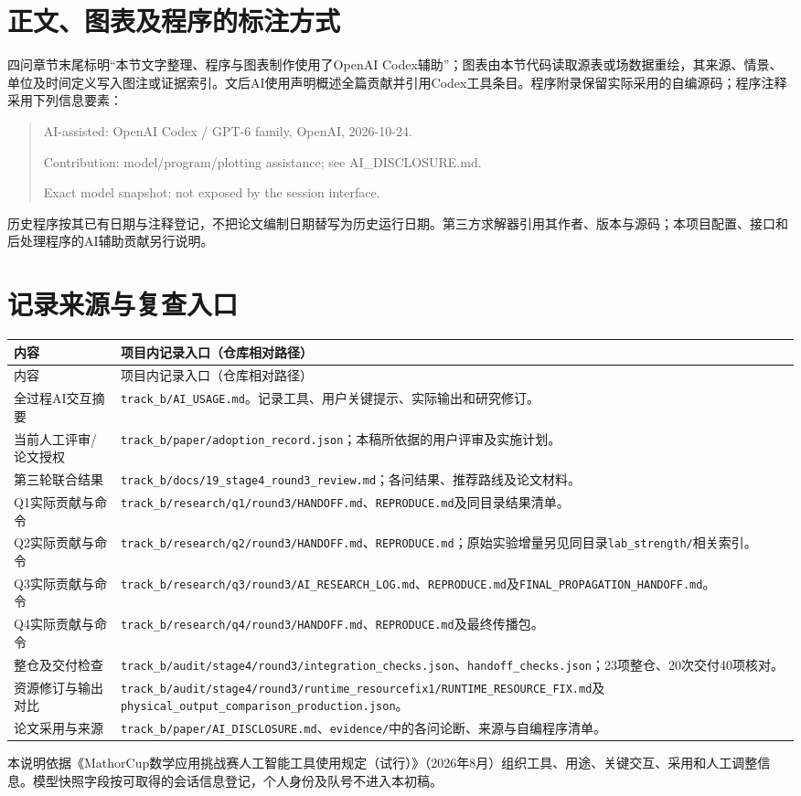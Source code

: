 \documentclass[UTF8,a4paper,zihao=-4,fontset=none]{ctexart}
\newcommand{\AIfile}[1]{\texttt{\nolinkurl{#1}}}
\begin{document}
\section{正文、图表及程序的标注方式}
四问章节末尾标明“本节文字整理、程序与图表制作使用了OpenAI Codex辅助”；图表由本节代码读取源表或场数据重绘，其来源、情景、单位及时间定义写入图注或证据索引。文后AI使用声明概述全篇贡献并引用Codex工具条目。程序附录保留实际采用的自编源码；程序注释采用下列信息要素：
\begin{quote}\small
AI-assisted: OpenAI Codex / GPT-6 family, OpenAI, 2026-10-24.\par
Contribution: model/program/plotting assistance; see AI\_DISCLOSURE.md.\par
Exact model snapshot: not exposed by the session interface.
\end{quote}
历史程序按其已有日期与注释登记，不把论文编制日期替写为历史运行日期。第三方求解器引用其作者、版本与源码；本项目配置、接口和后处理程序的AI辅助贡献另行说明。

\clearpage
\section{记录来源与复查入口}\label{sec:ai-evidence}
\begingroup\small
\begin{longtable}{p{3.6cm}p{10.0cm}}
\toprule 内容 & 项目内记录入口（仓库相对路径） \\
\midrule\endfirsthead
\toprule 内容 & 项目内记录入口（仓库相对路径） \\
\midrule\endhead
全过程AI交互摘要 & \AIfile{track_b/AI_USAGE.md}。记录工具、用户关键提示、实际输出和研究修订。 \\
当前人工评审/论文授权 & \AIfile{track_b/paper/adoption_record.json}；本稿所依据的用户评审及实施计划。 \\
第三轮联合结果 & \AIfile{track_b/docs/19_stage4_round3_review.md}；各问结果、推荐路线及论文材料。 \\
Q1实际贡献与命令 & \AIfile{track_b/research/q1/round3/HANDOFF.md}、\AIfile{REPRODUCE.md}及同目录结果清单。 \\
Q2实际贡献与命令 & \AIfile{track_b/research/q2/round3/HANDOFF.md}、\AIfile{REPRODUCE.md}；原始实验增量另见同目录\AIfile{lab_strength/}相关索引。 \\
Q3实际贡献与命令 & \AIfile{track_b/research/q3/round3/AI_RESEARCH_LOG.md}、\AIfile{REPRODUCE.md}及\AIfile{FINAL_PROPAGATION_HANDOFF.md}。 \\
Q4实际贡献与命令 & \AIfile{track_b/research/q4/round3/HANDOFF.md}、\AIfile{REPRODUCE.md}及最终传播包。 \\
整仓及交付检查 & \AIfile{track_b/audit/stage4/round3/integration_checks.json}、\AIfile{handoff_checks.json}；23项整仓、20次交付40项核对。 \\
资源修订与输出对比 & \AIfile{track_b/audit/stage4/round3/runtime_resourcefix1/RUNTIME_RESOURCE_FIX.md}及\AIfile{physical_output_comparison_production.json}。 \\
论文采用与来源 & \AIfile{track_b/paper/AI_DISCLOSURE.md}、\AIfile{evidence/}中的各问论断、来源与自编程序清单。 \\
\bottomrule
\end{longtable}
\endgroup

本说明依据《MathorCup数学应用挑战赛人工智能工具使用规定（试行）》（2026年8月）组织工具、用途、关键交互、采用和人工调整信息。模型快照字段按可取得的会话信息登记，个人身份及队号不进入本初稿。
\end{document}
